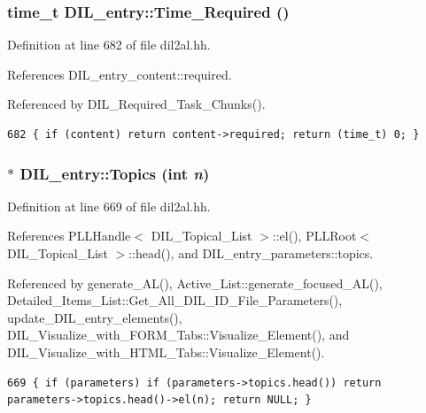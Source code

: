\subsubsection{\setlength{\rightskip}{0pt plus 5cm}time\_\-t DIL\_\-entry::Time\_\-Required ()\hspace{0.3cm}{\tt  [inline]}}\label{classDIL__entry_a14}




Definition at line 682 of file dil2al.hh.

References DIL\_\-entry\_\-content::required.

Referenced by DIL\_\-Required\_\-Task\_\-Chunks().



\footnotesize\begin{verbatim}682 { if (content) return content->required; return (time_t) 0; }
\end{verbatim}\normalsize 
{}
\subsubsection{$\ast$ DIL\_\-entry::Topics (int {\em n})\hspace{0.3cm}{\tt  [inline]}}\label{classDIL__entry_a6}




Definition at line 669 of file dil2al.hh.

References PLLHandle$<$ DIL\_\-Topical\_\-List $>$::el(), PLLRoot$<$ DIL\_\-Topical\_\-List $>$::head(), and DIL\_\-entry\_\-parameters::topics.

Referenced by generate\_\-AL(), Active\_\-List::generate\_\-focused\_\-AL(), Detailed\_\-Items\_\-List::Get\_\-All\_\-DIL\_\-ID\_\-File\_\-Parameters(), update\_\-DIL\_\-entry\_\-elements(), DIL\_\-Visualize\_\-with\_\-FORM\_\-Tabs::Visualize\_\-Element(), and DIL\_\-Visualize\_\-with\_\-HTML\_\-Tabs::Visualize\_\-Element().



\footnotesize\begin{verbatim}669 { if (parameters) if (parameters->topics.head()) return parameters->topics.head()->el(n); return NULL; }
\end{verbatim}\normalsize 
{}
